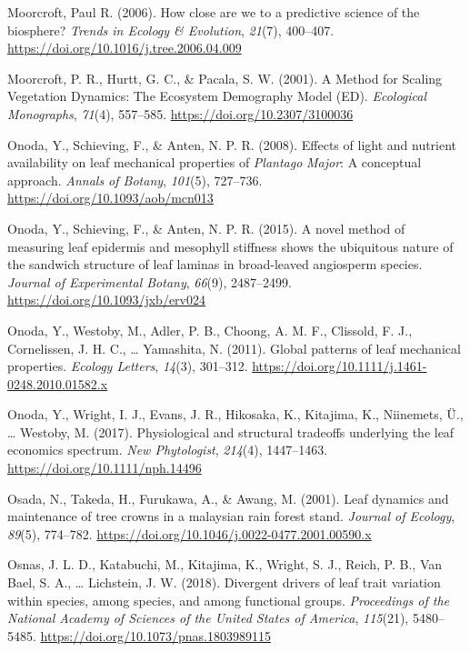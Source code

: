 \documentclass[
  12pt,
  letterpaper,
  DIV=11,
  numbers=noendperiod]{scrartcl}
\newlength{\cslhangindent}
\newlength{\cslentryspacingunit} %
\newenvironment{CSLReferences}[2] %
 {%
  \setlength{\parindent}{0pt}
  \ifodd #1
  \let\oldpar\par
  \def\par{\hangindent=\cslhangindent\oldpar}
  \fi
  \setlength{\parskip}{#2\cslentryspacingunit}
 }%
 {}
\begin{document}
\begin{CSLReferences}{1}{0}
\leavevmode{}%
Moorcroft, Paul R. (2006). How close are we to a predictive science of
the biosphere? \emph{Trends in Ecology \& Evolution}, \emph{21}(7),
400--407. \url{https://doi.org/10.1016/j.tree.2006.04.009}

\leavevmode{}%
Moorcroft, P. R., Hurtt, G. C., \& Pacala, S. W. (2001). A {Method} for
{Scaling Vegetation Dynamics}: {The Ecosystem Demography Model} ({ED}).
\emph{Ecological Monographs}, \emph{71}(4), 557--585.
\url{https://doi.org/10.2307/3100036}

\leavevmode{}%
Onoda, Y., Schieving, F., \& Anten, N. P. R. (2008). Effects of light
and nutrient availability on leaf mechanical properties of
{\emph{Plantago}}{ \emph{Major}}: {A} conceptual approach. \emph{Annals
of Botany}, \emph{101}(5), 727--736.
\url{https://doi.org/10.1093/aob/mcn013}

\leavevmode{}%
Onoda, Y., Schieving, F., \& Anten, N. P. R. (2015). A novel method of
measuring leaf epidermis and mesophyll stiffness shows the ubiquitous
nature of the sandwich structure of leaf laminas in broad-leaved
angiosperm species. \emph{Journal of Experimental Botany}, \emph{66}(9),
2487--2499. \url{https://doi.org/10.1093/jxb/erv024}

\leavevmode{}%
Onoda, Y., Westoby, M., Adler, P. B., Choong, A. M. F., Clissold, F. J.,
Cornelissen, J. H. C., \ldots{} Yamashita, N. (2011). Global patterns of
leaf mechanical properties. \emph{Ecology Letters}, \emph{14}(3),
301--312. \url{https://doi.org/10.1111/j.1461-0248.2010.01582.x}

\leavevmode{}%
Onoda, Y., Wright, I. J., Evans, J. R., Hikosaka, K., Kitajima, K.,
Niinemets, Ü., \ldots{} Westoby, M. (2017). Physiological and structural
tradeoffs underlying the leaf economics spectrum. \emph{New
Phytologist}, \emph{214}(4), 1447--1463.
\url{https://doi.org/10.1111/nph.14496}

\leavevmode{}%
Osada, N., Takeda, H., Furukawa, A., \& Awang, M. (2001). Leaf dynamics
and maintenance of tree crowns in a malaysian rain forest stand.
\emph{Journal of Ecology}, \emph{89}(5), 774--782.
\url{https://doi.org/10.1046/j.0022-0477.2001.00590.x}

\leavevmode{}%
Osnas, J. L. D., Katabuchi, M., Kitajima, K., Wright, S. J., Reich, P.
B., Van Bael, S. A., \ldots{} Lichstein, J. W. (2018). Divergent drivers
of leaf trait variation within species, among species, and among
functional groups. \emph{Proceedings of the National Academy of Sciences
of the United States of America}, \emph{115}(21), 5480--5485.
\url{https://doi.org/10.1073/pnas.1803989115}


\end{CSLReferences}
\end{document}
